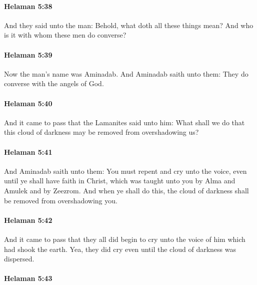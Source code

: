 		\paragraph{Helaman 5:38} %
			\label{HELAMAN-5-38}

			And they said unto the man:
			Behold, what doth all these things mean?
			And who is it with whom these men do converse?

		\paragraph{Helaman 5:39} %
			\label{HELAMAN-5-39}

			Now the man's name was Aminadab.
			And Aminadab saith unto them:
			They do converse with the angels of God.

		\paragraph{Helaman 5:40} %
			\label{HELAMAN-5-40}

			And it came to pass that the Lamanites said unto him:
			What shall we do that this cloud of darkness
			may be removed from overshadowing us?

		\paragraph{Helaman 5:41} %
			\label{HELAMAN-5-41}

			And Aminadab saith unto them:
			You must repent and cry unto the voice,
			even until ye shall have faith in Christ,
			which was taught unto you by Alma and Amulek and by Zeezrom.
			And when ye shall do this,
			the cloud of darkness shall be removed from overshadowing you.

		\paragraph{Helaman 5:42} %
			\label{HELAMAN-5-42}

			And it came to pass that they all did begin
			to cry unto the voice of him which had shook the earth.
			Yea, they did cry even until the cloud of darkness was dispersed.

		\paragraph{Helaman 5:43} %
			\label{HELAMAN-5-43}

